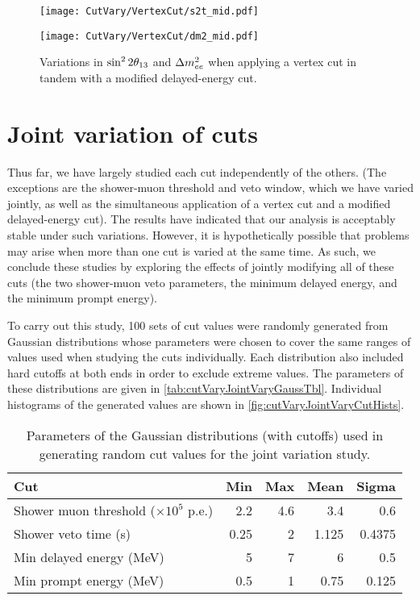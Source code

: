 \documentclass[../thesis.tex]{subfiles}
\begin{document}
\begin{figure}[ht]
  \begin{minipage}{0.47\linewidth}%
    \texttt{[image: CutVary/VertexCut/s2t\_mid.pdf]}%
  \end{minipage}%
  \begin{minipage}{0.47\linewidth}%
    \texttt{[image: CutVary/VertexCut/dm2\_mid.pdf]}%
  \end{minipage}%
  \caption{Variations in $\sin^2 2\theta_{13}$ and $\Delta m^2_{ee}$ when applying a vertex cut in tandem with a modified delayed-energy cut.}
  \label{fig:cutVaryVtxCutWithDelayed}
\end{figure}

\section{Joint variation of cuts}
\label{sec:cutVaryJoint}

Thus far, we have largely studied each cut independently of the others. (The exceptions are the shower-muon threshold and veto window, which we have varied jointly, as well as the simultaneous application of a vertex cut and a modified delayed-energy cut). The results have indicated that our analysis is acceptably stable under such variations. However, it is hypothetically possible that problems may arise when more than one cut is varied at the same time. As such, we conclude these studies by exploring the effects of jointly modifying all of these cuts (the two shower-muon veto parameters, the minimum delayed energy, and the minimum prompt energy). 

To carry out this study, 100 sets of cut values were randomly generated from Gaussian distributions whose parameters were chosen to cover the same ranges of values used when studying the cuts individually. Each distribution also included hard cutoffs at both ends in order to exclude extreme values. The parameters of these distributions are given in \autoref{tab:cutVaryJointVaryGaussTbl}. Individual histograms of the generated values are shown in \autoref{fig:cutVaryJointVaryCutHists}.

\begin{table}[ht]
  \begin{tabular}{lrrrr}
    \toprule
    Cut & Min & Max & Mean & Sigma \\
    \midrule
    Shower muon threshold ($\times 10^5$ p.e.) & 2.2 & 4.6 & 3.4 & 0.6\\
    Shower veto time (s) & 0.25 & 2 & 1.125 & 0.4375\\
    Min delayed energy (MeV) & 5 & 7 & 6 & 0.5\\
    Min prompt energy (MeV) & 0.5 & 1 & 0.75 & 0.125\\
    \bottomrule
  \end{tabular}
  \caption{Parameters of the Gaussian distributions (with cutoffs) used in generating random cut values for the joint variation study.}
  \label{tab:cutVaryJointVaryGaussTbl}
\end{table}
\end{document}
